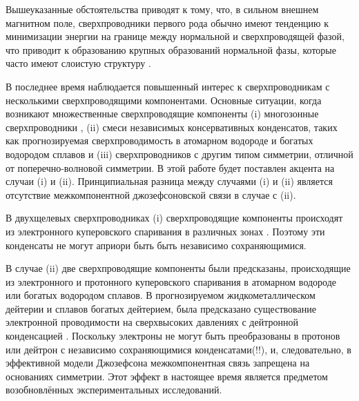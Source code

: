 Вышеуказанные обстоятельства приводят к тому, что, в сильном внешнем магнитном 
поле, сверхпроводники первого рода обычно имеют тенденцию к минимизации 
энергии на границе между нормальной и сверхпроводящей фазой, что приводит к 
образованию крупных образований нормальной фазы, которые часто имеют слоистую 
структуру \cite{bib:4}. 

В последнее время наблюдается повышенный интерес к сверхпроводникам с 
несколькими сверхпроводящими компонентами. Основные ситуации, когда возникают 
множественные сверхпроводящие компоненты (i) многозонные сверхпроводники
\cite{bib:6,bib:7,bib:8,bib:9,bib:10,bib:11}, (ii) смеси независимых 
консервативных конденсатов, таких как прогнозируемая сверхпроводимость в 
атомарном водороде и богатых водородом сплавов \cite{bib:12,bib:13,bib:14} и 
(iii) сверхпроводников с другим типом симметрии, отличной от 
поперечно-волновой симметрии. В этой работе будет поставлен акцента на случаи 
(i) и (ii). Принципиальная разница между случаями (i) и (ii) является 
отсутствие межкомпонентной джозефсоновской связи в случае с (ii).

В двухщелевых сверхпроводниках (i) сверхпроводящие компоненты происходят из
электронного куперовского спаривания в различных зонах \cite{bib:6}. Поэтому 
эти конденсаты не могут априори быть быть независимо сохраняющимися.

В случае (ii) две сверхпроводящие компоненты были предсказаны, происходящие 
из электронного и протонного куперовского спаривания в атомарном водороде 
или богатых водородом сплавов. В прогнозируемом жидкометаллическом дейтерии и 
сплавов богатых дейтерием, была предсказано существование электронной 
проводимости на сверхвысоких давлениях с дейтронной конденсацией  
\cite{bib:12,bib:13,bib:14}. Поскольку электроны не могут быть преобразованы в 
протонов или дейтрон с независимо сохраняющимися конденсатами(!!), и, 
следовательно, в эффективной модели Джозефсона межкомпонентная связь запрещена 
на основаниях симметрии. Этот эффект в настоящее время является предметом 
возобновлённых экспериментальных исследований.

